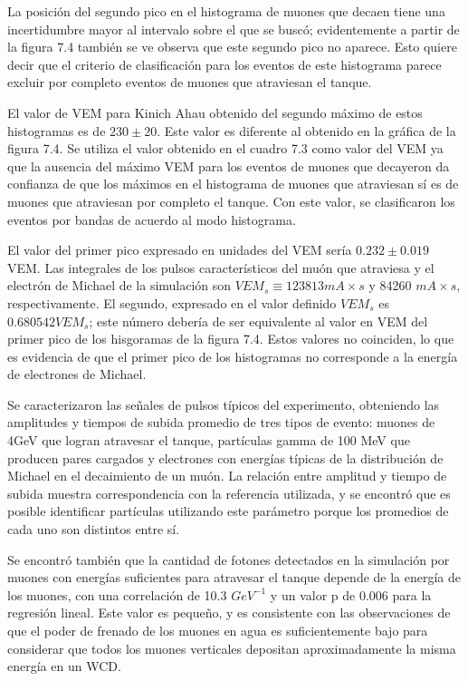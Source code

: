 \documentclass{book}
\begin{document}
La posici\'on del segundo pico en el histograma de muones que decaen tiene una incertidumbre mayor al intervalo sobre el que se busc\'o; evidentemente a partir de la figura 7.4 tambi\'en se ve observa que este segundo pico no aparece. Esto quiere decir que el criterio de clasificaci\'on para los eventos de este histograma parece excluir por completo eventos de muones que atraviesan el tanque.

El valor de VEM para Kinich Ahau obtenido del segundo m\'aximo de estos histogramas es de $230 \pm 20$. Este valor es diferente al obtenido en la gr\'afica de la figura 7.4. Se utiliza el valor obtenido en el cuadro 7.3 como valor del VEM ya que la ausencia del m\'aximo VEM para los eventos de muones que decayeron da confianza de que los m\'aximos en el histograma de muones que atraviesan s\'i es de muones que atraviesan por completo el tanque. Con este valor, se clasificaron los eventos por bandas de acuerdo al modo histograma.

El valor del primer pico expresado en unidades del VEM ser\'ia $0.232 \pm 0.019$ VEM. Las integrales de los pulsos caracter\'isticos del mu\'on que atraviesa y el electr\'on de Michael de la simulaci\'on son $VEM_s \equiv 123813 mA\times s$ y 84260 $mA\times s$, respectivamente. El segundo, expresado en el valor definido $VEM_s$ es $0.680542 VEM_s$; este n\'umero deber\'ia de ser equivalente al valor en VEM del primer pico de los hisgoramas de la figura 7.4. Estos valores no coinciden, lo que es evidencia de que el primer pico de los histogramas no corresponde a la energ\'ia de electrones de Michael.



Se caracterizaron las se\~nales de pulsos t\'ipicos del experimento, obteniendo las amplitudes y tiempos de subida promedio de tres tipos de evento: muones de 4GeV que logran atravesar el tanque, part\'iculas gamma de 100 MeV que producen pares cargados y electrones con energ\'ias t\'ipicas de la distribuci\'on de Michael en el decaimiento de un mu\'on. La relaci\'on entre amplitud y tiempo de subida muestra correspondencia con la referencia utilizada, y se encontr\'o que es posible identificar part\'iculas utilizando este par\'ametro porque los promedios de cada uno son distintos entre s\'i.

Se encontr\'o tambi\'en que la cantidad de fotones detectados en la simulaci\'on por muones con energ\'ias suficientes para atravesar el tanque depende de la energ\'ia de los muones, con una correlaci\'on de 10.3 $GeV^{-1}$ y un valor p de 0.006 para la regresi\'on lineal. Este valor es peque\~no, y es consistente con las observaciones de que el poder de frenado de los muones en agua es suficientemente bajo para considerar que todos los muones verticales depositan aproximadamente la misma energ\'ia en un WCD.
\end{document}
